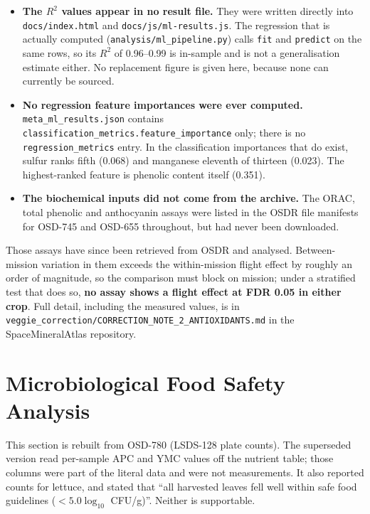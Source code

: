 \begin{itemize}
    \item \textbf{The $R^2$ values appear in no result file.} They were written
          directly into \texttt{docs/index.html} and \texttt{docs/js/ml-results.js}.
          The regression that is actually computed
          (\texttt{analysis/ml\_pipeline.py}) calls \texttt{fit} and
          \texttt{predict} on the same rows, so its $R^2$ of 0.96--0.99 is
          in-sample and is not a generalisation estimate either. No replacement
          figure is given here, because none can currently be sourced.
    \item \textbf{No regression feature importances were ever computed.}
          \texttt{meta\_ml\_results.json} contains
          \texttt{classification\_metrics.feature\_importance} only; there is no
          \texttt{regression\_metrics} entry. In the classification importances
          that do exist, sulfur ranks fifth (0.068) and manganese eleventh of
          thirteen (0.023). The highest-ranked feature is phenolic content itself
          (0.351).
    \item \textbf{The biochemical inputs did not come from the archive.} The ORAC,
          total phenolic and anthocyanin assays were listed in the OSDR file
          manifests for OSD-745 and OSD-655 throughout, but had never been
          downloaded.
\end{itemize}

Those assays have since been retrieved from OSDR and analysed. Between-mission
variation in them exceeds the within-mission flight effect by roughly an order of
magnitude, so the comparison must block on mission; under a stratified test that
does so, \textbf{no assay shows a flight effect at FDR 0.05 in either crop}. Full
detail, including the measured values, is in
\texttt{veggie\_correction/CORRECTION\_NOTE\_2\_ANTIOXIDANTS.md} in the
SpaceMineralAtlas repository.

\section{Microbiological Food Safety Analysis}
This section is rebuilt from OSD-780 (LSDS-128 plate counts). The superseded
version read per-sample APC and YMC values off the nutrient table; those columns
were part of the literal data and were not measurements. It also reported counts
for lettuce, and stated that ``all harvested leaves fell well within safe food
guidelines ($< 5.0\log_{10}$ CFU/g)''. Neither is supportable.

